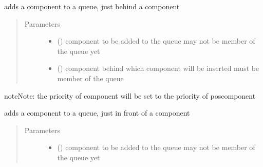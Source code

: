 \documentclass[letterpaper,10pt,english]{sphinxmanual}
\begin{document}
\begin{fulllineitems}
\begin{fulllineitems}
\end{fulllineitems}


\begin{fulllineitems}
\label{\detokenize{Reference:salabim.Queue.add_behind}}
adds a component to a queue, just behind a component
\begin{quote}\begin{description}
\item[{Parameters}] \leavevmode\begin{itemize}
\item {} 
 ({\hyperref[\detokenize{Reference:salabim.Component}]{}}) \textendash{} component to be added to the queue 
may not be member of the queue yet

\item {} 
 ({\hyperref[\detokenize{Reference:salabim.Component}]{}}) \textendash{} component behind which component will be inserted 
must be member of the queue

\end{itemize}

\end{description}\end{quote}

\begin{sphinxadmonition}{note}{Note:}
the priority of component will be set to the priority of poscomponent
\end{sphinxadmonition}

\end{fulllineitems}


\begin{fulllineitems}
\label{\detokenize{Reference:salabim.Queue.add_in_front_of}}
adds a component to a queue, just in front of a component
\begin{quote}\begin{description}
\item[{Parameters}] \leavevmode\begin{itemize}
\item {} 
 ({\hyperref[\detokenize{Reference:salabim.Component}]{}}) \textendash{} component to be added to the queue 
may not be member of the queue yet


\end{itemize}
\end{description}
\end{quote}
\end{fulllineitems}
\end{fulllineitems}
\end{document}
